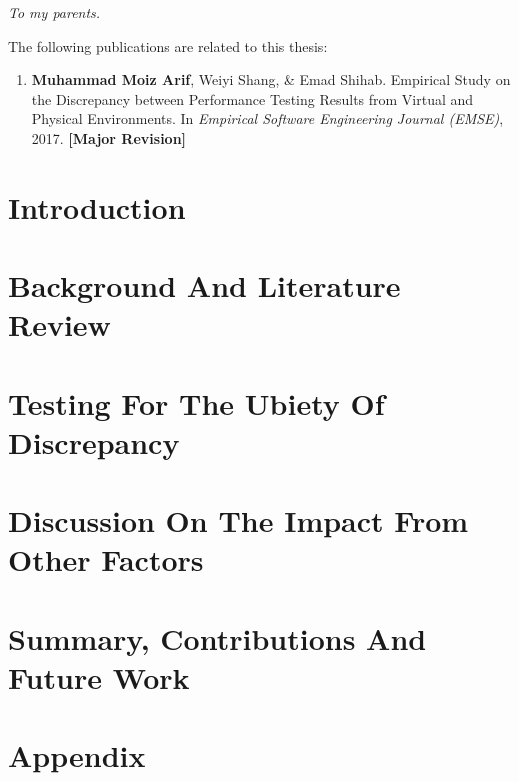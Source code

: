 \documentclass[12pt]{report}
\begin{document}
\begin{dedication}
	\begin{flushright}
		\textit{To my parents.}
	\end{flushright}

	
\end{dedication}

\begin{publications}

The following publications are related to this thesis:

\begin{enumerate}

\item {\textbf{Muhammad Moiz Arif}, Weiyi Shang, \& Emad Shihab. Empirical Study on the Discrepancy between Performance Testing Results from Virtual and Physical Environments. In \textit{Empirical Software Engineering Journal (EMSE)}, 2017. \textbf{[Major Revision]}} 

\end{enumerate}

\end{publications}

\chapter{Introduction}
\label{introduction}


\chapter{Background And Literature Review}
\label{background_and_literature_review}


\chapter{Testing For The Ubiety Of Discrepancy}
\label{chapter3}


\chapter{Discussion On The Impact From Other Factors}
\label{chapter4}


\chapter{Summary, Contributions And Future Work}
\label{conclusion}


\chapter{Appendix}
\label{appendix}


  

\end{document}
